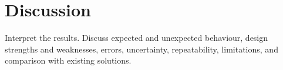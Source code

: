 \section{Discussion}
Interpret the results. Discuss expected and unexpected behaviour, design strengths
and weaknesses, errors, uncertainty, repeatability, 
limitations, and comparison with existing solutions.
